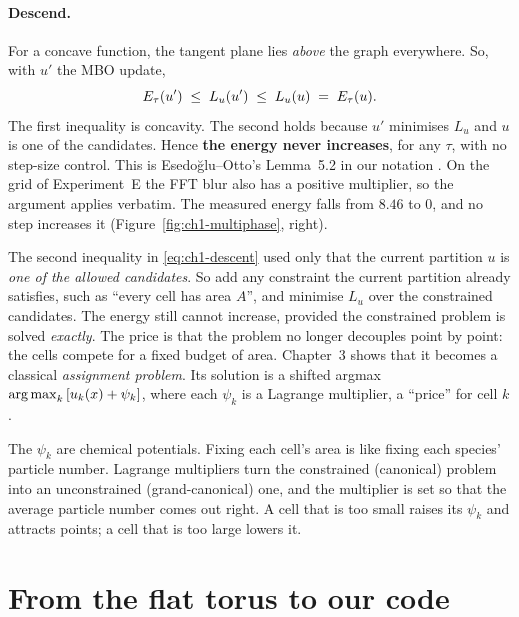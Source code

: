 \paragraph{Descend.}
For a concave function, the tangent plane lies \emph{above} the graph
everywhere. So, with $u'$ the MBO update,
\begin{equation}
  E_\tau(u') \;\le\; L_u(u') \;\le\; L_u(u) \;=\; E_\tau(u).
  \label{eq:ch1-descent}
\end{equation}
The first inequality is concavity. The second holds because $u'$ minimises $L_u$
and $u$ is one of the candidates. Hence \textbf{the energy never increases},
for any $\tau$, with no step-size control. This is Esedo\u{g}lu--Otto's Lemma~5.2
in our notation \cite{esedoglu2015threshold}. On the grid of Experiment~E the
FFT blur also has a positive multiplier, so the argument applies verbatim. The
measured energy falls from $8.46$ to $0$, and no step increases it
(Figure~\ref{fig:ch1-multiphase}, right).

\begin{keyidea}[title={Key idea: why this is the door to auction dynamics}]
The second inequality in \eqref{eq:ch1-descent} used only that the current
partition $u$ is \emph{one of the allowed candidates}. So add any constraint the
current partition already satisfies, such as ``every cell has area $A$'', and
minimise $L_u$ over the constrained candidates. The energy still cannot
increase, provided the constrained problem is solved \emph{exactly}. The price
is that the problem no longer decouples point by point: the cells compete for a
fixed budget of area. Chapter~3 shows that it becomes a classical
\emph{assignment problem}. Its solution is a shifted argmax
$\operatorname*{arg\,max}_k\,[u_k(x) + \psi_k]$, where each $\psi_k$ is a Lagrange multiplier,
a ``price'' for cell $k$.
\end{keyidea}

\begin{physics}
The $\psi_k$ are chemical potentials. Fixing each cell's area is like fixing
each species' particle number. Lagrange multipliers turn the constrained
(canonical) problem into an unconstrained (grand-canonical) one, and the
multiplier is set so that the average particle number comes out right. A cell
that is too small raises its $\psi_k$ and attracts points; a cell that is too
large lowers it.
\end{physics}

\section{From the flat torus to our code}
\label{sec:ch1-code}


